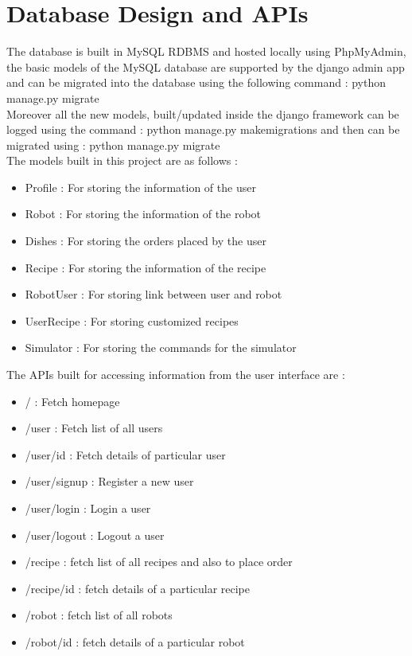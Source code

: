 \section{Database Design and APIs}
{\normalsize The database is built in MySQL RDBMS and hosted locally using PhpMyAdmin, the basic models of the MySQL database are supported by the django admin app and can be migrated into the database using the following command : python manage.py migrate \\[0.1in]
Moreover all the new models, built/updated inside the django framework can be logged using the command : python manage.py makemigrations and then can be migrated using : python manage.py migrate \\[0.1in]
The models built in this project are as follows : 
\begin{itemize}
    \item Profile : For storing the information of the user
    \item Robot : For storing the information of the robot
    \item Dishes : For storing the orders placed by the user
    \item Recipe : For storing the information of the recipe 
    \item RobotUser : For storing link between user and robot
    \item UserRecipe : For storing customized recipes
    \item Simulator : For storing the commands for the simulator
\end{itemize}
The APIs built for accessing information from the user interface are :
\begin{itemize}
    \item / : Fetch homepage
    \item /user : Fetch list of all users
    \item /user/{id} : Fetch details of particular user
    \item /user/signup : Register a new user
    \item /user/login : Login a user
    \item /user/logout : Logout a user
    \item /recipe : fetch list of all recipes and also to place order
    \item /recipe/{id} : fetch details of a particular recipe
    \item /robot : fetch list of all robots
    \item /robot/{id} : fetch details of a particular robot 

\end{itemize}}
